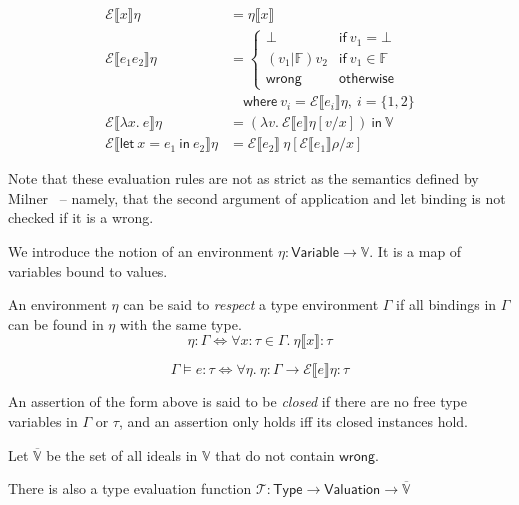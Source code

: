 \begin{align*}
  \mathcal{E} \llbracket x \rrbracket \eta
  &= \eta \llbracket x \rrbracket \\
  \mathcal{E} \llbracket e_1 e_2 \rrbracket \eta
  &=
    \begin{cases}
      \bot & \mathsf{if} \ v_1 = \bot \\
      (v_1 | \mathbb{F}) v_2 & \mathsf{if} \ v_1 \in \mathbb{F} \\
      \mathsf{wrong} & \mathsf{otherwise}
    \end{cases}
  \\
  & \quad \textsf{where} \ v_i = \mathcal{E} \llbracket e_i \rrbracket \eta , \ i = \{
    1, 2\} \\
  \mathcal{E} \llbracket \lambda x . \ e \rrbracket \eta
  &=
    (\lambda v . \ \mathcal{E} \llbracket e \rrbracket \eta [v / x ])
    \ \mathsf{in} \ \mathbb{V} \\
  \mathcal{E} \llbracket \textsf{let} \ x = e_1 \ \textsf{in} \ e_2 \rrbracket \eta
  &=
    \mathcal{E} \llbracket e_2 \rrbracket \ \eta [ \mathcal{E} \llbracket e_1 \rrbracket\rho / x ]
\end{align*}

Note that these evaluation rules are not as strict as the semantics
defined by Milner~\cite{milner78} -- namely, that the second argument
of application and let binding is not checked if it is a \textsf{wrong}.

We introduce the notion of an environment $\eta : \mathsf{Variable} \rightarrow
\mathbb{V}$. It is a map of variables bound to values.

An environment $\eta$ can be said to \textit{respect} a type environment
$\Gamma$ if all bindings in $\Gamma$ can be found in $\eta$ with the same type.
$$\eta : \Gamma \iff \forall x : \tau \in \Gamma. \ \eta \llbracket x \rrbracket : \tau$$

$$\Gamma \vDash e : \tau \iff
\forall \eta. \ \eta : \Gamma \rightarrow \mathcal{E} \llbracket e \rrbracket \eta : \tau $$

An assertion of the form above is said to be \textit{closed} if there
are no free type variables in $\Gamma$ or $\tau$, and an assertion only holds
iff its closed instances hold.

Let $\overline{\mathbb{V}}$ be the set of all ideals in $\mathbb{V}$
that do not contain $\mathsf{wrong}$.

There is also a type evaluation function $\mathcal{T} : \mathsf{Type}
\rightarrow \mathsf{Valuation} \rightarrow \overline{\mathbb{V}}$

